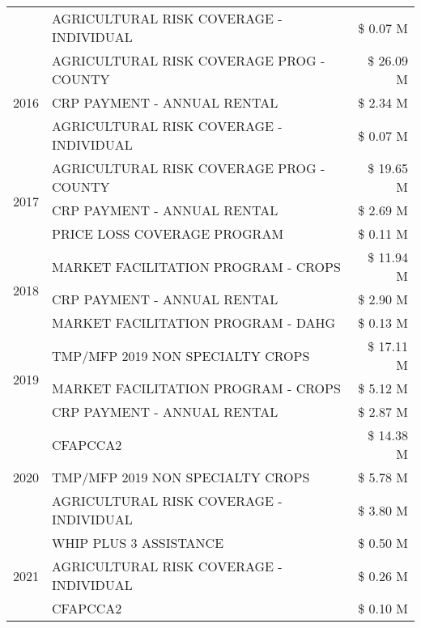 \begin{tabular}{llr}
 & AGRICULTURAL RISK COVERAGE - INDIVIDUAL & \$ 0.07 M \\
\cline{1-3}
\multirow[t]{3}{*}{2016} & AGRICULTURAL RISK COVERAGE PROG - COUNTY      & \$ 26.09 M \\
 & CRP PAYMENT - ANNUAL RENTAL                   & \$ 2.34 M \\
 & AGRICULTURAL RISK COVERAGE - INDIVIDUAL       & \$ 0.07 M \\
\cline{1-3}
\multirow[t]{3}{*}{2017} & AGRICULTURAL RISK COVERAGE PROG - COUNTY & \$ 19.65 M \\
 & CRP PAYMENT - ANNUAL RENTAL & \$ 2.69 M \\
 & PRICE LOSS COVERAGE PROGRAM & \$ 0.11 M \\
\cline{1-3}
\multirow[t]{3}{*}{2018} & MARKET FACILITATION PROGRAM - CROPS & \$ 11.94 M \\
 & CRP PAYMENT - ANNUAL RENTAL & \$ 2.90 M \\
 & MARKET FACILITATION PROGRAM - DAHG & \$ 0.13 M \\
\cline{1-3}
\multirow[t]{3}{*}{2019} & TMP/MFP 2019 NON SPECIALTY CROPS & \$ 17.11 M \\
 & MARKET FACILITATION PROGRAM - CROPS & \$ 5.12 M \\
 & CRP PAYMENT - ANNUAL RENTAL & \$ 2.87 M \\
\cline{1-3}
\multirow[t]{3}{*}{2020} & CFAPCCA2 & \$ 14.38 M \\
 & TMP/MFP 2019 NON SPECIALTY CROPS & \$ 5.78 M \\
 & AGRICULTURAL RISK COVERAGE - INDIVIDUAL & \$ 3.80 M \\
\cline{1-3}
\multirow[t]{3}{*}{2021} & WHIP PLUS 3 ASSISTANCE & \$ 0.50 M \\
 & AGRICULTURAL RISK COVERAGE - INDIVIDUAL & \$ 0.26 M \\
 & CFAPCCA2 & \$ 0.10 M \\
\cline{1-3}
\bottomrule
\end{tabular}
